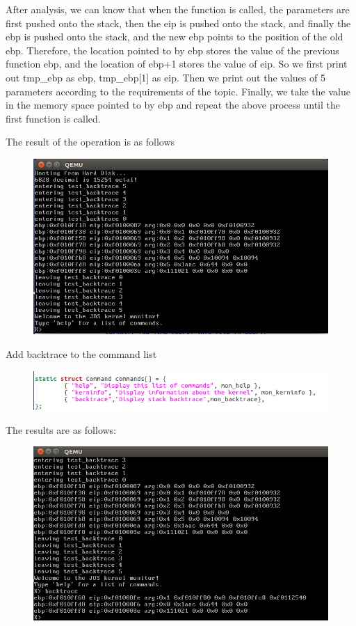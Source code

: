 After analysis, we can know that when the function is called, the parameters are first pushed onto the stack, then the eip is pushed onto the stack, and finally the ebp is pushed onto the stack, and the new ebp points to the position of the old ebp. Therefore, the location pointed to by ebp stores the value of the previous function ebp, and the location of ebp+1 stores the value of eip. So we first print out tmp\_ebp as ebp, tmp\_ebp[1] as eip. Then we print out the values ​​of 5 parameters according to the requirements of the topic. Finally, we take the value in the memory space pointed to by ebp and repeat the above process until the first function is called.

The result of the operation is as follows
\begin{figure}[H]
  \centering
  \includegraphics[width=0.8\linewidth]{figure/mon_backtrace_qemu}
\end{figure}

Add backtrace to the command list
\begin{figure}[H]
  \centering
  \includegraphics[width=0.8\linewidth]{figure/add_backtrace}
\end{figure}

The results are as follows:
\begin{figure}[H]
  \centering
  \includegraphics[width=0.8\linewidth]{figure/backtrace_result}
\end{figure}
